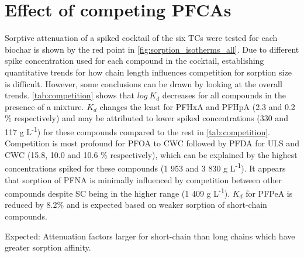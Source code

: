 
\section{Effect of competing PFCAs}
Sorptive attenuation of a spiked cocktail of the six TCs were tested for each biochar is shown by the red point in \cref{fig:sorption_isotherms_all}. Due to different spike concentration used for each compound in the cocktail, establishing quantitative trends for how chain length influences competition for sorption size is difficult. However, some conclusions can be drawn by looking at the overall trends. \cref{tab:competition} shows that $log~K_d$ decreases for all compounds in the presence of a mixture. $K_d$ changes the least for PFHxA and PFHpA (2.3 and 0.2 \% respectively) and may be attributed to lower spiked concentrations (330 and 117 \textmu g L\textsuperscript{-1}) for these compounds compared to the rest in \cref{tab:competition}. Competition is most profound for PFOA to CWC followed by PFDA for ULS and CWC (15.8, 10.0 and 10.6 \% respectively), which can be explained by the highest concentrations spiked for these compounds (1 953 and 3 830 \textmu g L\textsuperscript{-1}). It appears that sorption of PFNA is minimally influenced by competition between other compounds despite SC being in the higher range (1 409 \textmu g L\textsuperscript{-1}). $K_d$ for PFPeA is reduced by 8.2\% and is expected based on weaker sorption of short-chain compounds.

Expected: Attenuation factors larger for short-chain than long chains which have greater sorption affinity.

